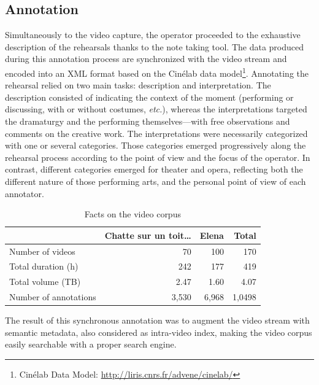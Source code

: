 \documentclass[conference]{IEEEtran}
\begin{document}
\subsection{Annotation}
Simultaneously to the video capture, the operator proceeded to the exhaustive description of the rehearsals thanks to the note taking tool. The data produced during this annotation process are synchronized with the video stream and encoded into an XML format based on the Cinélab data model\footnote{Cinélab Data Model: \url{http://liris.cnrs.fr/advene/cinelab/}}.
Annotating the rehearsal relied on two main tasks: description and interpretation. The description consisted of indicating the context of the moment (performing or discussing, with or without costumes, \emph{etc.}), whereas the interpretations targeted the dramaturgy and the performing themselves---with free observations and comments on the creative work. The interpretations were necessarily categorized with one or several categories. Those categories emerged progressively along the rehearsal process according to the point of view and the focus of the operator. 
In contrast, different categories emerged for theater and opera, reflecting both the different nature of those performing arts, and the personal point of view of each annotator.

\begin{table}
\centering
{\small
\begin{tabular}{|l|r|r|r|}
\hline 
  & Chatte sur un toit\ldots & Elena & Total \\ 
\hline 
Number of videos & 70 & 100 & 170 \\ 
\hline 
Total duration (h) & 242 & 177 & 419 \\ 
\hline 
Total volume (TB) & 2.47 & 1.60 & 4.07 \\ 
\hline 
Number of annotations & 3,530 & 6,968 & 1,0498\\ 
\hline
\end{tabular} 
}
\caption{Facts on the video corpus}
\label{table_facts}
\end{table}

The result of this synchronous annotation was to augment the video stream with semantic metadata, also considered as intra-video index, making the video corpus easily searchable with a proper search engine.
\end{document}
